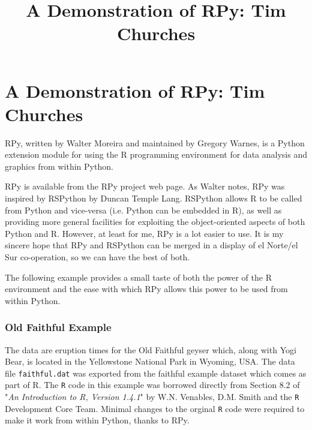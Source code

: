 \documentclass[11pt]{article}
\title{A Demonstration of RPy: Tim Churches}
\begin{document}
\newpage
\section{A Demonstration of RPy: Tim Churches}

RPy, written by Walter Moreira and maintained by Gregory Warnes, is a Python extension module for using the R programming environment for data analysis and graphics from within Python.

RPy is available from the RPy project web page. As Walter notes, RPy was inspired by RSPython by Duncan Temple Lang. RSPython allows R to be called from Python and vice-versa (i.e. Python can be embedded in R), as well as providing more general facilities for exploiting the object-oriented aspects of both Python and R. However, at least for me, RPy is a lot easier to use. It is my sincere hope that RPy and RSPython can be merged in a display of el Norte/el Sur co-operation, so we can have the best of both.

The following example provides a small taste of both the power of the R environment and the ease with which RPy allows this power to be used from within Python.
\subsubsection{Old Faithful Example}
The data are eruption times for the Old Faithful geyser which, along with Yogi Bear, is located in the Yellowstone National Park in Wyoming, USA. The data file \texttt{faithful.dat} was exported from the faithful example dataset which comes as part of R. The \texttt{R} code in this example was borrowed directly from Section 8.2 of "\textit{An Introduction to R, Version 1.4.1}" by W.N. Venables, D.M. Smith and the \texttt{R} Development Core Team. Minimal changes to the orginal \texttt{R} code were required to make it work from within Python, thanks to RPy.
\end{document}
